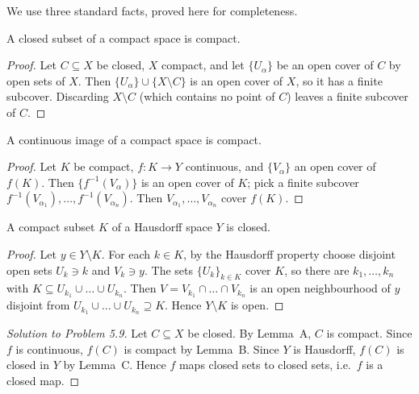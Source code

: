 
We use three standard facts, proved here for completeness.

\begin{lemma}[A]
A closed subset of a compact space is compact.
\end{lemma}
\begin{proof}
Let $C\subseteq X$ be closed, $X$ compact, and let $\{U_\alpha\}$ be an open cover of $C$ by open
sets of $X$. Then $\{U_\alpha\}\cup\{X\setminus C\}$ is an open cover of $X$, so it has a finite
subcover. Discarding $X\setminus C$ (which contains no point of $C$) leaves a finite subcover of
$C$.
\end{proof}

\begin{lemma}[B]
A continuous image of a compact space is compact.
\end{lemma}
\begin{proof}
Let $K$ be compact, $f\colon K\to Y$ continuous, and $\{V_\alpha\}$ an open cover of $f(K)$.
Then $\{f^{-1}(V_\alpha)\}$ is an open cover of $K$; pick a finite subcover
$f^{-1}(V_{\alpha_1}),\dots,f^{-1}(V_{\alpha_n})$. Then $V_{\alpha_1},\dots,V_{\alpha_n}$ cover
$f(K)$.
\end{proof}

\begin{lemma}[C]
A compact subset $K$ of a Hausdorff space $Y$ is closed.
\end{lemma}
\begin{proof}
Let $y\in Y\setminus K$. For each $k\in K$, by the Hausdorff property choose disjoint open sets
$U_k\ni k$ and $V_k\ni y$. The sets $\{U_k\}_{k\in K}$ cover $K$, so there are
$k_1,\dots,k_n$ with $K\subseteq U_{k_1}\cup\dots\cup U_{k_n}$. Then
$V=V_{k_1}\cap\dots\cap V_{k_n}$ is an open neighbourhood of $y$ disjoint from
$U_{k_1}\cup\dots\cup U_{k_n}\supseteq K$. Hence $Y\setminus K$ is open.
\end{proof}

\begin{proof}[Solution to Problem 5.9]
Let $C\subseteq X$ be closed. By Lemma~A, $C$ is compact. Since $f$ is continuous, $f(C)$ is
compact by Lemma~B. Since $Y$ is Hausdorff, $f(C)$ is closed in $Y$ by Lemma~C. Hence $f$ maps
closed sets to closed sets, i.e.\ $f$ is a closed map.
\end{proof}

